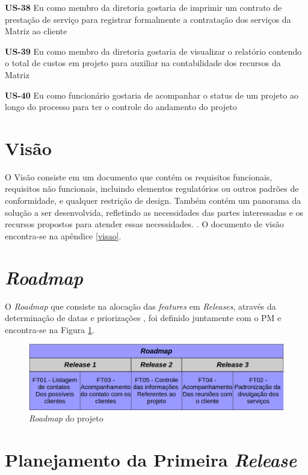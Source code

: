 \textbf{US-38} Eu como membro da diretoria gostaria de imprimir um contrato de prestação de serviço para registrar formalmente a contratação dos serviços da Matriz ao cliente


\textbf{US-39} Eu como membro da diretoria gostaria de visualizar o relatório contendo o total de custos em projeto para auxiliar na contabilidade dos recursos da Matriz


\textbf{US-40} Eu como funcionário gostaria de acompanhar o status de um projeto ao longo do processo para ter o controle do andamento do projeto

\section{Visão}

O Visão consiste em um documento que contém os requisitos funcionais, requisitos não funcionais, incluindo elementos regulatórios 
ou outros padrões de conformidade, e qualquer restrição de design. Também contém um panorama da solução a ser desenvolvida, 
refletindo as necessidades das partes interessadas e os recursos propostos para atender essas necessidades. \cite{safe}. 
O documento de visão encontra-se na apêndice \ref{visao}.

\section{\textit{Roadmap}}

O \textit{Roadmap} que consiste na alocação das \textit{features} em \textit{Releases}, através da determinação de datas e priorizações \cite{safe}, foi 
definido juntamente com o PM e encontra-se na Figura \ref{roadmap}.

\begin{figure}[!h]
\centering
\includegraphics[scale=0.4]{figuras/roadmap.png}
\caption{\textit{Roadmap} do projeto}
\label{roadmap}
\end{figure}

\pagebreak

\section{Planejamento da Primeira \textit{Release}}

